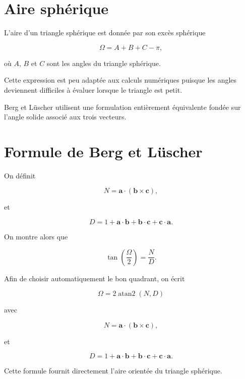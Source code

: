 \documentclass[11pt,a4paper]{article}
\begin{document}
\section{Aire sphérique}

L'aire d'un triangle sphérique est donnée par son excès sphérique

\[
\Omega=A+B+C-\pi,
\]

où $A$, $B$ et $C$ sont les angles du triangle sphérique.

Cette expression est peu adaptée aux calculs numériques puisque les angles
deviennent difficiles à évaluer lorsque le triangle est petit.

Berg et Lüscher utilisent une formulation entièrement équivalente fondée sur
l'angle solide associé aux trois vecteurs.

\section{Formule de Berg et Lüscher}

On définit

\begin{equation}
N=
\mathbf{a}\cdot
(\mathbf{b}\times\mathbf{c}),
\end{equation}

et

\begin{equation}
D=
1+
\mathbf{a}\cdot\mathbf{b}
+\mathbf{b}\cdot\mathbf{c}
+\mathbf{c}\cdot\mathbf{a}.
\end{equation}

On montre alors que

\begin{equation}
\tan\left(\frac{\Omega}{2}\right)
=
\frac{N}{D}.
\end{equation}

Afin de choisir automatiquement le bon quadrant, on écrit

\begin{equation}
\boxed{
\Omega
=
2\operatorname{atan2}(N,D)
}
\end{equation}

avec

\[
N=
\mathbf{a}\cdot(\mathbf{b}\times\mathbf{c}),
\]

et

\[
D=
1+\mathbf{a}\cdot\mathbf{b}
+\mathbf{b}\cdot\mathbf{c}
+\mathbf{c}\cdot\mathbf{a}.
\]

Cette formule fournit directement l'aire orientée du triangle sphérique.
\end{document}

